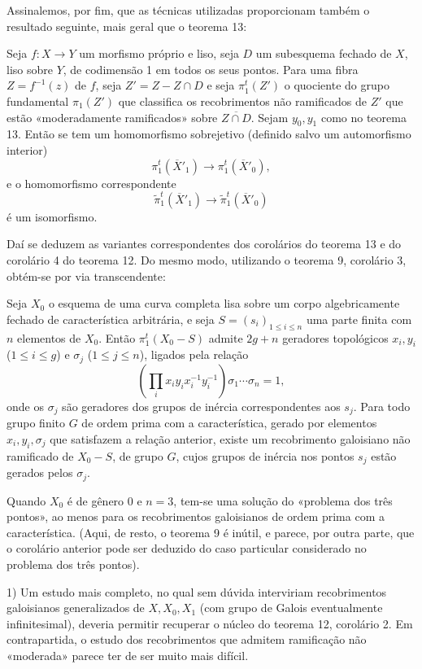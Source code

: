 Assinalemos, por fim, que as técnicas utilizadas proporcionam também o
resultado seguinte, mais geral que o teorema 13:

 Seja $f:X\longrightarrow Y$ um morfismo próprio e liso,
seja $D$ um subesquema fechado de $X$, liso sobre $Y$, de codimensão 1 em
todos os seus pontos. Para uma fibra $Z=f^{-1}(z)$ de $f$, seja $Z'=Z-Z\cap D$ e seja
$\pi_1^t(Z')$ o quociente do grupo fundamental $\pi_1(Z')$ que classifica os
recobrimentos não ramificados de $Z'$ que estão «moderadamente ramificados»
sobre $\overline{Z\cap D}$. Sejam $y_0,y_1$ como no teorema 13. Então se
tem um homomorfismo sobrejetivo (definido salvo um automorfismo interior)
\[
  \pi_1^t(\overline X'_1)\longrightarrow\pi_1^t(\overline X'_0),
\]
e o homomorfismo correspondente
\[
  \widetilde\pi_1^t(\overline X'_1)
  \longrightarrow\widetilde\pi_1^t(\overline X'_0)
\]
é um isomorfismo.

Daí se deduzem as variantes correspondentes dos corolários do
teorema 13 e do corolário 4 do teorema 12. Do mesmo modo, utilizando o
teorema 9, corolário 3, obtém-se por via transcendente:

 Seja $X_0$ o esquema de uma curva completa lisa sobre um
corpo algebricamente fechado de característica arbitrária, e seja
$S=(s_i)_{1\le i\le n}$ uma parte finita com $n$ elementos de $X_0$. Então
$\pi_1^t(X_0-S)$ admite $2g+n$ geradores topológicos
$x_i,y_i$ ($1\le i\le g$) e $\sigma_j$ ($1\le j\le n$), ligados pela relação
\[
  \left(\prod_i x_i y_i x_i^{-1}y_i^{-1}\right)
  \sigma_1\cdots\sigma_n=1,
\]
onde os $\sigma_j$ são geradores dos grupos de inércia correspondentes
aos $s_j$. Para todo grupo finito $G$ de ordem prima com a característica,
gerado por elementos $x_i,y_i,\sigma_j$ que satisfazem a relação anterior,
existe um recobrimento galoisiano não ramificado de $X_0-S$, de grupo $G$, cujos
grupos de inércia nos pontos $s_j$ estão gerados pelos $\sigma_j$.

Quando $X_0$ é de gênero 0 e $n=3$, tem-se uma solução do «problema dos
três pontos», ao menos para os recobrimentos galoisianos de ordem prima com
a característica. (Aqui, de resto, o teorema 9 é inútil, e parece, por
outra parte, que o corolário anterior pode ser deduzido do caso particular
considerado no problema dos três pontos).


1) Um estudo mais completo, no qual sem dúvida interviriam recobrimentos
galoisianos generalizados de $X,X_0,X_1$ (com grupo de Galois eventualmente
infinitesimal), deveria permitir recuperar o núcleo do teorema 12, corolário
2. Em contrapartida, o estudo dos recobrimentos que admitem ramificação não
«moderada» parece ter de ser muito mais difícil.

